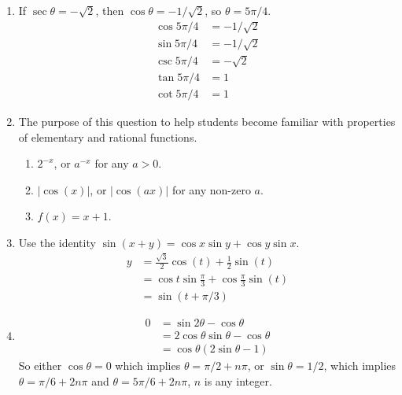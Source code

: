 \begin{enumerate}
	\item If $\sec \theta = -\sqrt{2}$, then $\cos\theta = -1/\sqrt{2}$, so $\theta = 5\pi/4$. 
    \begin{align*}
    	\cos 5\pi/4 &= -1/\sqrt{2} \\
        \sin 5\pi/4 &= -1/\sqrt{2} \\
        \csc 5\pi/4 &= -\sqrt{2} \\
        \tan 5\pi/4 &= 1 \\
        \cot 5\pi/4 &= 1
    \end{align*}
    \item The purpose of this question to help students become familiar with properties of elementary and rational functions.
    	\begin{enumerate} 
    		\item $2^{-x}$, or $a^{-x}$ for any $a > 0$. 
            \item $|\cos(x)|$, or $|\cos(a x)|$ for any non-zero $a$.
            \item $f(x) = x + 1$.
        \end{enumerate}
       \item Use the identity $\sin (x + y) = \cos x \sin y + \cos y \sin x$. 
       \begin{align*}
       		y &= \frac{\sqrt{3}}{2}\cos(t) + \frac{1}{2}\sin(t) \\
            &= \cos t \sin \frac{\pi}{3} + \cos \frac{\pi}{3} \sin(t) \\
            &= \sin (t + \pi / 3)
       \end{align*}
       \item \begin{align*}
        0 &= \sin2\theta-\cos\theta \\
        &= 2\cos \theta \sin\theta - \cos\theta \\
        &= \cos \theta (2\sin\theta -1)
       \end{align*}
       So either $\cos\theta = 0$ which implies $\theta = \pi/2 + n\pi$, or $\sin\theta = 1/2$, which implies $\theta = \pi/6 + 2n\pi$ and $\theta = 5\pi/6 + 2n\pi$, $n$ is any integer.
       
       
       
       
       
\end{enumerate}